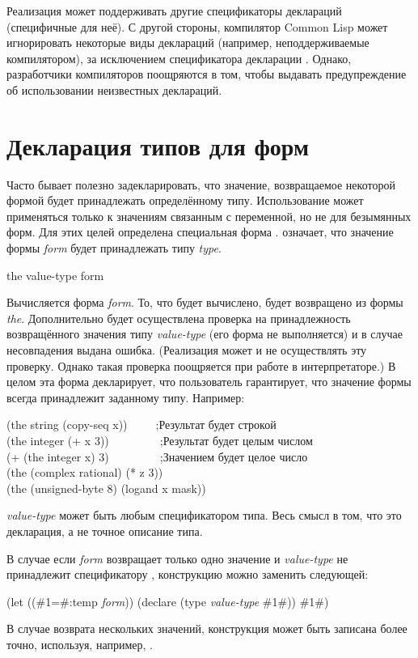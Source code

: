 Реализация может поддерживать другие спецификаторы деклараций (специфичные для
неё).
С другой стороны, компилятор Common Lisp может игнорировать некоторые виды
деклараций (например, неподдерживаемые компилятором), за исключением
спецификатора декларации .
Однако, разработчики компиляторов поощряются в том, чтобы выдавать
предупреждение об использовании неизвестных деклараций.

\section{Декларация типов для форм}

Часто бывает полезно задекларировать, что значение, возвращаемое некоторой
формой будет принадлежать определённому типу.
Использование  может применяться только к значениям связанным с
переменной, но не для безымянных форм. Для этих целей определена специальная
форма .   означает, что значение
формы \emph{form} будет принадлежать типу \emph{type}.

\begin{defspec}
the value-type form

Вычисляется форма \emph{form}. То, что будет вычислено, будет возвращено из
формы \emph{the}. Дополнительно будет осуществлена проверка на принадлежность
возвращённого значения типу \emph{value-type} (его форма не выполняется) и в
случае несовпадения выдана ошибка. (Реализация может и не осуществлять эту
проверку. Однако такая проверка поощряется при работе в интерпретаторе.) В целом
эта форма декларирует, что пользователь гарантирует, что значение формы всегда
принадлежит заданному типу.
Например:
\begin{lisp}
(the string (copy-seq x))~~~~~;\textrm{Результат будет строкой} \\
(the integer (+ x 3))~~~~~~~~~;\textrm{Результат \cdf{+} будет целым числом} \\
(+ (the integer x) 3)~~~~~~~~~;\textrm{Значением  будет целое число} \\
(the (complex rational) (* z 3)) \\
(the (unsigned-byte 8) (logand x mask))
\end{lisp}

\emph{value-type} может быть любым спецификатором типа. Весь смысл в
том, что это декларация, а не точное описание типа.

В случае если \emph{form} возвращает только одно значение и
\emph{value-type} не принадлежит спецификатору ,
конструкцию  можно заменить следующей:
\begin{lisp}
(let ((\#1=\#:temp \emph{form})) (declare (type \emph{value-type} \#1\#)) \#1\#)
\end{lisp}
В случае возврата нескольких значений, конструкция может быть записана
более точно, используя, например, .
\end{defspec}

\fi